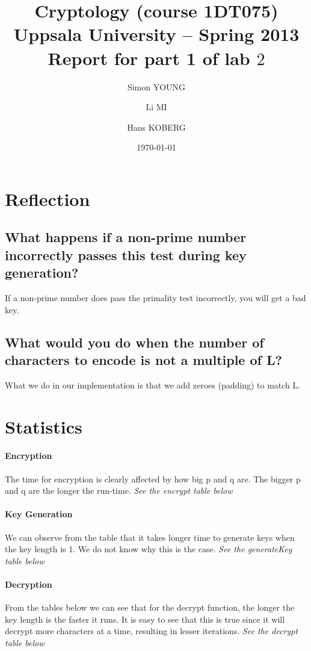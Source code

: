 \documentclass[a4paper,11pt]{article}
\title{\textbf{Cryptology (course 1DT075) \\ 
    Uppsala University -- Spring 2013 \\
    Report for part 1 of lab $2$
  }
}
\author{Simon YOUNG \and Li MI \and Hans KOBERG} %
\date{\today}
\begin{document}
\maketitle

\section{Reflection}

\subsection{What happens if a non-prime number incorrectly passes this test during key generation?}
If a non-prime number does pass the primality test incorrectly, you will get a bad key. \emph{}

\subsection{What would you do when the number of characters to encode is not a multiple of L?}
What we do in our implementation is that we add zeroes (padding) to match L. 

\section{Statistics}

\paragraph{Encryption} The time for encryption is clearly affected by how big p and q are. The bigger p and q are the longer the run-time. 
\emph{See the encrypt table below}

\paragraph{Key Generation}
We can observe from the table that it takes longer time to generate keys when the key length is 1. We do not know why this is the case.
\emph{See the generateKey table below}

\paragraph{Decryption}
From the tables below we can see that for the decrypt function, the longer the key length is the faster it runs. It is easy to see that this is true since it will decrypt more characters at a time, resulting in lesser iterations. \emph{See the decrypt table below}
\end{document}
